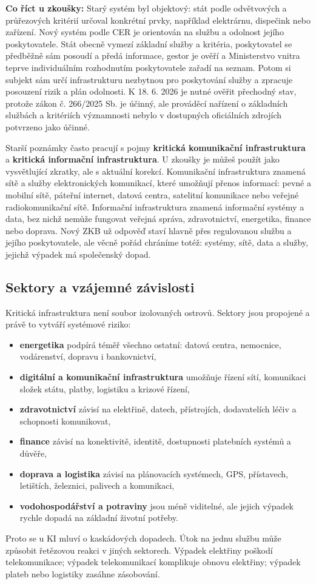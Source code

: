 \documentclass[11pt,a4paper]{article}
\newcommand{\zkouska}[1]{\begin{tcolorbox}[breakable,enhanced,colback=blue!7,colframe=blue!30!black,boxrule=0pt,arc=1mm,left=5pt,right=5pt,top=5pt,bottom=5pt,before skip=6pt,after skip=6pt]\textbf{Co říct u zkoušky:} #1\end{tcolorbox}}
\begin{document}
\zkouska{Starý systém byl objektový: stát podle odvětvových a průřezových kritérií určoval konkrétní prvky, například elektrárnu, dispečink nebo zařízení. Nový systém podle CER je orientován na službu a odolnost jejího poskytovatele. Stát obecně vymezí základní služby a kritéria, poskytovatel se předběžně sám posoudí a předá informace, gestor je ověří a Ministerstvo vnitra teprve individuálním rozhodnutím poskytovatele zařadí na seznam. Potom si subjekt sám určí infrastrukturu nezbytnou pro poskytování služby a zpracuje posouzení rizik a plán odolnosti. K 18. 6. 2026 je nutné ověřit přechodný stav, protože zákon č. 266/2025 Sb. je účinný, ale prováděcí nařízení o základních službách a kritériích významnosti nebylo v dostupných oficiálních zdrojích potvrzeno jako účinné.}

Starší poznámky často pracují s pojmy \textbf{kritická komunikační infrastruktura} a \textbf{kritická informační infrastruktura}. U zkoušky je můžeš použít jako vysvětlující zkratky, ale s aktuální korekcí. Komunikační infrastruktura znamená sítě a služby elektronických komunikací, které umožňují přenos informací: pevné a mobilní sítě, páteřní internet, datová centra, satelitní komunikace nebo veřejné radiokomunikační sítě. Informační infrastruktura znamená informační systémy a data, bez nichž nemůže fungovat veřejná správa, zdravotnictví, energetika, finance nebo doprava. Nový ZKB už odpověď staví hlavně přes regulovanou službu a jejího poskytovatele, ale věcně pořád chráníme totéž: systémy, sítě, data a služby, jejichž výpadek má společenský dopad.

\subsection*{Sektory a vzájemné závislosti}
Kritická infrastruktura není soubor izolovaných ostrovů. Sektory jsou propojené a právě to vytváří systémové riziko:
\begin{itemize}
  \item \textbf{energetika} podpírá téměř všechno ostatní: datová centra, nemocnice, vodárenství, dopravu i bankovnictví,
  \item \textbf{digitální a komunikační infrastruktura} umožňuje řízení sítí, komunikaci složek státu, platby, logistiku a krizové řízení,
  \item \textbf{zdravotnictví} závisí na elektřině, datech, přístrojích, dodavatelích léčiv a schopnosti komunikovat,
  \item \textbf{finance} závisí na konektivitě, identitě, dostupnosti platebních systémů a důvěře,
  \item \textbf{doprava a logistika} závisí na plánovacích systémech, GPS, přístavech, letištích, železnici, palivech a komunikaci,
  \item \textbf{vodohospodářství a potraviny} jsou méně viditelné, ale jejich výpadek rychle dopadá na základní životní potřeby.
\end{itemize}
Proto se u KI mluví o kaskádových dopadech. Útok na jednu službu může způsobit řetězovou reakci v jiných sektorech. Výpadek elektřiny poškodí telekomunikace; výpadek telekomunikací komplikuje obnovu elektřiny; výpadek plateb nebo logistiky zasáhne zásobování.
\end{document}
